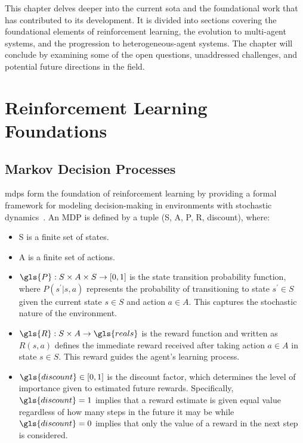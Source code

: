 \glsresetall

This chapter delves deeper into the current \gls{sota} and the 
foundational work that has contributed to its development. 
It is divided into sections covering the foundational elements 
of reinforcement learning, the evolution to multi-agent systems, 
and the progression to heterogeneous-agent systems. 
The chapter will conclude by examining some of the open questions, 
unaddressed challenges, and potential future directions in the field.

\section{Reinforcement Learning Foundations}%

    \subsection*{Markov Decision Processes}%

\Glspl{mdp} form the foundation of reinforcement learning by providing 
a formal framework for modeling decision-making in environments with 
stochastic dynamics~\cite{puterman2005}. An MDP is defined by a tuple 
(\gls{S}, \gls{A}, \gls{P}, \gls{R}, \gls{discount}), where:
\begin{itemize}
    \item \gls{S} is a finite set of states.
    \item \gls{A} is a finite set of actions.
    \item \(\gls{P}: S\times A\times S\rightarrow [0,1]\) is the state 
        transition probability function, where \(P(s^\prime|s, a)\) 
        represents the probability of transitioning to state \(s^\prime\in S\)
        given the current state \(s\in S\) and action \(a\in A\).
        This captures the stochastic nature of the environment.
    \item \(\gls{R}: S \times A \rightarrow \gls{reals}\) is the reward 
        function and written as \(R(s, a)\) defines the immediate reward 
        received after taking action \(a\in A\) in state \(s\in S\). 
        This reward guides the agent's learning process.
    \item \(\gls{discount} \in [0, 1]\) is the discount factor, which 
        determines the level of importance given to estimated future rewards. 
        Specifically, \(\gls{discount}=1\) implies that a reward estimate is 
        given equal value regardless of how many steps in the future it may 
        be while \(\gls{discount}=0\) implies that only the value of a 
        reward in the next step is considered.
\end{itemize}

